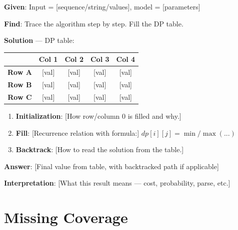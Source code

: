 
\begin{tcolorbox}[colback=blue!5!white,colframe=blue!75!black,
    title=\textbf{Worked Example 4: [Algorithm] Trace (from source)}]

\textbf{Given}: Input = [sequence/string/values], model = [parameters]

\textbf{Find}: Trace the algorithm step by step. Fill the DP table.

\textbf{Solution} --- DP table:

\begin{center}
\begin{tabular}{|c|c|c|c|c|}
\hline
 & \textbf{Col 1} & \textbf{Col 2} & \textbf{Col 3} & \textbf{Col 4} \\ \hline
\textbf{Row A} & [val] & [val] & [val] & [val] \\ \hline
\textbf{Row B} & [val] & [val] & [val] & [val] \\ \hline
\textbf{Row C} & [val] & [val] & [val] & [val] \\ \hline
\end{tabular}
\end{center}

\begin{enumerate}
    \item \textbf{Initialization}: [How row/column 0 is filled and why.]
    \item \textbf{Fill}: [Recurrence relation with formula:] $dp[i][j] = \min/\max(...)$
    \item \textbf{Backtrack}: [How to read the solution from the table.]
\end{enumerate}

\textbf{Answer}: [Final value from table, with backtracked path if applicable]

\textbf{Interpretation}: [What this result means — cost, probability, parse, etc.]
\end{tcolorbox}


\section*{Missing Coverage}

